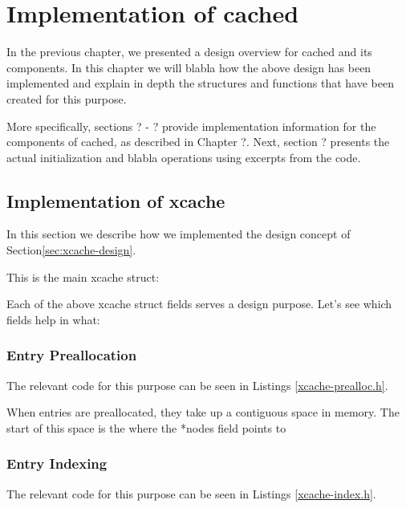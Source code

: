 \chapter{Implementation of cached}\label{ch:cached-implementation}

In the previous chapter, we presented a design overview for cached and its 
components. In this chapter we will blabla how the above design has been
implemented and explain in depth the structures and functions that have been 
created for this purpose.

More specifically, sections ? - ? provide implementation information for the 
components of cached, as described in Chapter ?. Next, section ? presents the 
actual initialization and blabla operations using excerpts from the code.

\section{Implementation of xcache}

In this section we describe how we implemented the design concept of 
Section\ref{sec:xcache-design}.

This is the main xcache struct:


Each of the above xcache struct fields serves a design purpose.
Let's see which fields help in what:

\subsection{Entry Preallocation}

The relevant code for this purpose can be seen in Listings 
\ref{xcache-prealloc.h}.


When entries are preallocated, they take up a contiguous space in memory. The 
start of this space is the where the *nodes field points to 



\subsection{Entry Indexing}

The relevant code for this purpose can be seen in Listings \ref{xcache-index.h}.



